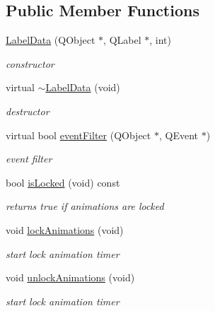 \subsection*{Public Member Functions}
\begin{DoxyCompactItemize}
\item 
\mbox{\label{class_label_data_aa9a99cf910e35f22d9e2bc43348221d6}} 
\hyperlink{class_label_data_aa9a99cf910e35f22d9e2bc43348221d6}{Label\+Data} (Q\+Object $\ast$, Q\+Label $\ast$, int)
\begin{DoxyCompactList}\small\item\em constructor \end{DoxyCompactList}\item 
\mbox{\label{class_label_data_a957db004621f4ff6b98b050e7d2c9f00}} 
virtual \hyperlink{class_label_data_a957db004621f4ff6b98b050e7d2c9f00}{$\sim$\+Label\+Data} (void)
\begin{DoxyCompactList}\small\item\em destructor \end{DoxyCompactList}\item 
\mbox{\label{class_label_data_a2912ffe7543319c73ea6736bce9b9d9a}} 
virtual bool \hyperlink{class_label_data_a2912ffe7543319c73ea6736bce9b9d9a}{event\+Filter} (Q\+Object $\ast$, Q\+Event $\ast$)
\begin{DoxyCompactList}\small\item\em event filter \end{DoxyCompactList}\item 
\mbox{\label{class_label_data_a85d9efcc37a6f956523d2f841c09b4c7}} 
bool \hyperlink{class_label_data_a85d9efcc37a6f956523d2f841c09b4c7}{is\+Locked} (void) const
\begin{DoxyCompactList}\small\item\em returns true if animations are locked \end{DoxyCompactList}\item 
\mbox{\label{class_label_data_a8ef4695665ac639f705e9a582c5900d8}} 
void \hyperlink{class_label_data_a8ef4695665ac639f705e9a582c5900d8}{lock\+Animations} (void)
\begin{DoxyCompactList}\small\item\em start lock animation timer \end{DoxyCompactList}\item 
\mbox{\label{class_label_data_acbaf89c8276871050ec3b72b3c290fd0}} 
void \hyperlink{class_label_data_acbaf89c8276871050ec3b72b3c290fd0}{unlock\+Animations} (void)
\begin{DoxyCompactList}\small\item\em start lock animation timer \end{DoxyCompactList}\end{DoxyCompactItemize}
